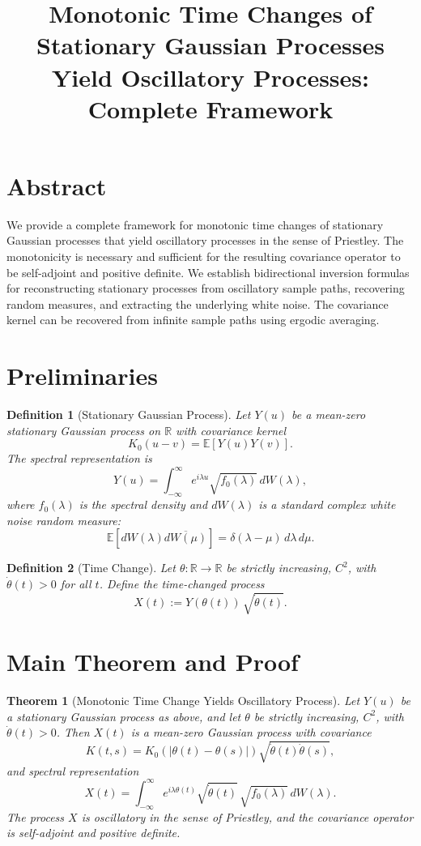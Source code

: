 \documentclass{article}
\title{Monotonic Time Changes of Stationary Gaussian Processes Yield Oscillatory Processes: Complete Framework}
\author{}
\date{}
\newtheorem{theorem}{Theorem}
\newtheorem{definition}{Definition}
\begin{document}
\maketitle

\section*{Abstract}
We provide a complete framework for monotonic time changes of stationary Gaussian processes that yield oscillatory processes in the sense of Priestley. The monotonicity is necessary and sufficient for the resulting covariance operator to be self-adjoint and positive definite. We establish bidirectional inversion formulas for reconstructing stationary processes from oscillatory sample paths, recovering random measures, and extracting the underlying white noise. The covariance kernel can be recovered from infinite sample paths using ergodic averaging.

\section{Preliminaries}

\begin{definition}[Stationary Gaussian Process]
Let $Y(u)$ be a mean-zero stationary Gaussian process on $\mathbb{R}$ with covariance kernel
\[
K_0(u-v) = \mathbb{E}[Y(u)Y(v)].
\]
The spectral representation is
\[
Y(u) = \int_{-\infty}^\infty e^{i\lambda u} \sqrt{f_0(\lambda)}\, dW(\lambda),
\]
where $f_0(\lambda)$ is the spectral density and $dW(\lambda)$ is a standard complex white noise random measure:
\[
\mathbb{E}[dW(\lambda)\overline{dW(\mu)}] = \delta(\lambda-\mu)\, d\lambda\, d\mu.
\]
\end{definition}

\begin{definition}[Time Change]
Let $\theta:\mathbb{R} \to \mathbb{R}$ be strictly increasing, $C^2$, with $\dot\theta(t)>0$ for all $t$. Define the time-changed process
\[
X(t) := Y(\theta(t))\, \sqrt{\dot\theta(t)}.
\]
\end{definition}

\section{Main Theorem and Proof}

\begin{theorem}[Monotonic Time Change Yields Oscillatory Process]
Let $Y(u)$ be a stationary Gaussian process as above, and let $\theta$ be strictly increasing, $C^2$, with $\dot\theta(t)>0$. Then $X(t)$ is a mean-zero Gaussian process with covariance
\[
K(t,s) = K_0(|\theta(t)-\theta(s)|)\sqrt{\dot\theta(t)\dot\theta(s)},
\]
and spectral representation
\[
X(t) = \int_{-\infty}^\infty e^{i\lambda\theta(t)} \sqrt{\dot\theta(t)}\, \sqrt{f_0(\lambda)}\, dW(\lambda).
\]
The process $X$ is oscillatory in the sense of Priestley, and the covariance operator is self-adjoint and positive definite.
\end{theorem}
\end{document}
